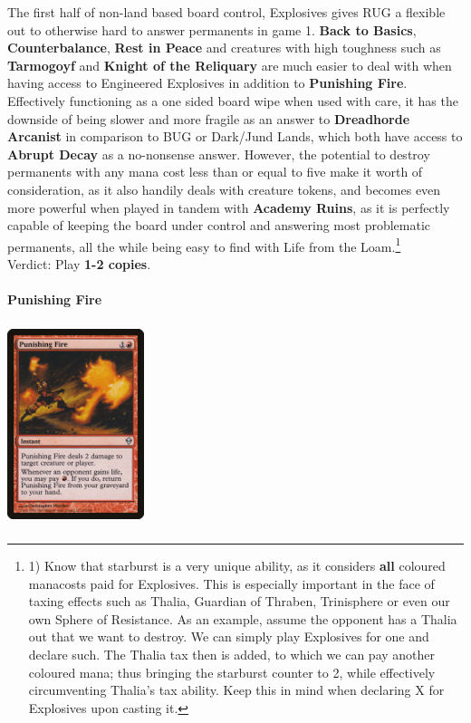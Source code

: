 \documentclass{report}
\begin{document}
The first half of non-land based board control, Explosives gives RUG a flexible out to otherwise hard to answer permanents in game 1. \textbf{Back to Basics}, \textbf{Counterbalance}, \textbf{Rest in Peace} and creatures with high toughness such as \textbf{Tarmogoyf} and \textbf{Knight of the Reliquary} are much easier to deal with when having access to Engineered Explosives in addition to \textbf{Punishing Fire}. Effectively functioning as a one sided board wipe when used with care, it has the downside of being slower and more fragile as an answer to \textbf{Dreadhorde Arcanist} in comparison to BUG or Dark/Jund Lands, which both have access to \textbf{Abrupt Decay} as a no-nonsense answer. However, the potential to destroy permanents with any mana cost less than or equal to five make it worth of consideration, as it also handily deals with creature tokens, and becomes even more powerful when played in tandem with \textbf{Academy Ruins}, as it is perfectly capable of keeping the board under control and answering most problematic permanents, all the while being easy to find with Life from the Loam.\footnote{1) Know that starburst is a very unique ability, as it considers \textbf{all} coloured manacosts paid for Explosives. This is especially important in the face of taxing effects such as Thalia, Guardian of Thraben, Trinisphere or even our own Sphere of Resistance. As an example, assume the opponent has a Thalia out that we want to destroy. We can simply play Explosives for one and declare such. The Thalia tax then is added, to which we can pay another coloured mana; thus bringing the starburst counter to 2, while effectively circumventing Thalia's tax ability. Keep this in mind when declaring X for Explosives upon casting it.}\\
Verdict: Play \textbf{1-2 copies}.\\\\
\textbf{Punishing Fire}
\begin{center}
\includegraphics [width = 4cm, height = 6cm] {punishing-fire}
\end{center}
\end{document}

